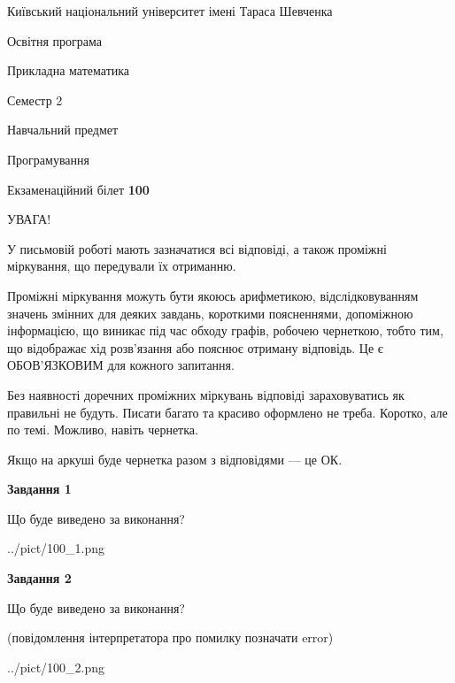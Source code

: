 \documentclass[12pt, ukrainian]{article}
\begin{document}
{{\begin {small}\par
{ \center  Київський національний університет імені Тараса Шевченка \par}
{\parbox {5 cm}{Освітня програма \hfill}{\parbox {7 cm}{Прикладна математика\hfill}}\parbox {6 cm}{\hfill Семестр 2}}\par
{\parbox {5 cm} {Навчальний предмет \hfill}\parbox {7 cm}{Програмування \hfill}\parbox {6cm}{\hfill}\par}\vspace{-7pt} \end{small}}{\center Екзаменаційний білет \No \textbf
{ 100 }\par}}
{
\begin {large}
УВАГА!

У письмовій роботі мають зазначатися всі відповіді, а також проміжні міркування, що передували їх отриманню.

Проміжні міркування можуть бути якоюсь арифметикою, відслідковуванням зна\-чень змінних для деяких завдань,
короткими поясненнями, допоміжною інформацією, що виникає під час обходу графів, робочею чернеткою,
тобто тим, що відображає хід розв’язання або пояснює отриману відповідь.
Це є ОБОВ’ЯЗКОВИМ для кожного запитання.

Без наявності доречних проміжних міркувань відповіді зараховуватись як правиль\-ні не будуть.
Писати багато та красиво оформлено не треба. Коротко, але по темі. Можли\-во, навіть чернетка.

Якщо на аркуші буде чернетка разом з відповідями --- це ОК.

\newpage

{\begin {center}\textbf{Завдання 1}\end {center}}\par
Що буде виведено за виконання?\par
\begin{center}
	{../pict/100_1.png}
\end{center}
\newpage

{\begin {center}\textbf{Завдання 2}\end {center}}\par
Що буде виведено за виконання?\par
 (повідомлення інтерпретатора про помилку позначати error)\par
\begin{center}
	{../pict/100_2.png}
\end{center}
\newpage


\end{large}}
\end{document}
